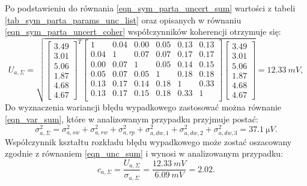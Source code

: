 Po podstawieniu do równania \eqref{eqn_sym_parta_uncert_sum} wartości z tabeli \ref{tab_sym_parta_params_unc_list} oraz opisanych w równaniu \eqref{eqn_sym_parta_uncert_coher} współczynników koherencji otrzymuje się:
\begin{equation}
U_{a,\Sigma} = \sqrt{
\begin{bmatrix}
3.49 \\ 3.01 \\ 5.06 \\ 1.87 \\ 4.68 \\ 4.67
\end{bmatrix}^{T}
\begin{bmatrix}
1    & 0.04 & 0.00 & 0.05 & 0.13 & 0.13 \\
0.04 & 1    & 0.07 & 0.07 & 0.17 & 0.17 \\
0.00 & 0.07 & 1    & 0.05 & 0.14 & 0.15 \\
0.05 & 0.07 & 0.05 & 1    & 0.18 & 0.18 \\
0.13 & 0.17 & 0.14 & 0.18 & 1    & 0.33 \\
0.13 & 0.17 & 0.15 & 0.18 & 0.33 & 1    \\
\end{bmatrix}
\begin{bmatrix}
3.49 \\ 3.01 \\ 5.06 \\ 1.87 \\ 4.68 \\ 4.67
\end{bmatrix}} = \qty{12.33}{mV}
\label{eqn_sym_parta_uncert_value_a},
\end{equation}
Do wyznaczenia wariancji błędu wypadkowego zastosować można równanie \eqref{eqn_var_sum}, które w analizowanym przypadku przyjmuje postać:
\begin{equation}
\sigma_{a,\Sigma}^{2} = \sigma_{a,sw}^{2} + \sigma_{a,rw}^{2} + \sigma_{a,rp}^{2} + \sigma_{a,dw,1}^{2} + \sigma_{a,dw,2}^{2} + \sigma_{a,dw,3}^{2} = \qty{37.1}{\micro V} \label{eqn_sym_parta_var_sum}.
\end{equation}
Współczynnik kształtu rozkładu błędu wypadkowego może zostać oszacowany zgodnie z równaniem \eqref{eqn_unc_sum} i wynosi w analizowanym przypadku:
\begin{equation}
c_{a,\Sigma} = \frac{U_{a,\Sigma}}{\sigma_{a,\Sigma}} = \frac{\qty{12.33}{mV}}{\qty{6.09}{mV}} = 2.02 \label{eqn_sym_parta_uncert_factor}.
\end{equation}

